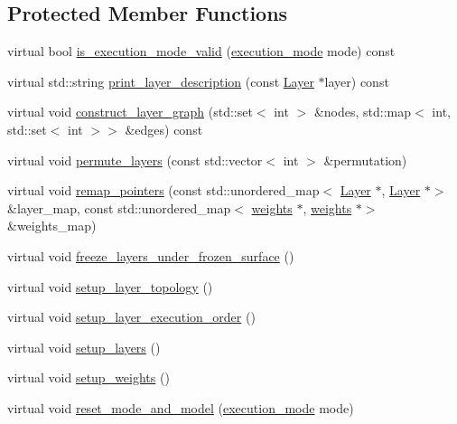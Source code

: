 \subsection*{Protected Member Functions}
\begin{DoxyCompactItemize}
\item 
virtual bool \hyperlink{classlbann_1_1model_a2c82c9def03b1c60e48f52fca7708833}{is\+\_\+execution\+\_\+mode\+\_\+valid} (\hyperlink{base_8hpp_a2781a159088df64ed7d47cc91c4dc0a8}{execution\+\_\+mode} mode) const
\item 
virtual std\+::string \hyperlink{classlbann_1_1model_ab173fd93a80a2980059ff292c308cbf5}{print\+\_\+layer\+\_\+description} (const \hyperlink{classlbann_1_1Layer}{Layer} $\ast$layer) const
\item 
virtual void \hyperlink{classlbann_1_1model_aef7a4775c70f96610bfc5a4605b946a5}{construct\+\_\+layer\+\_\+graph} (std\+::set$<$ int $>$ \&nodes, std\+::map$<$ int, std\+::set$<$ int $>$$>$ \&edges) const
\item 
virtual void \hyperlink{classlbann_1_1model_a31c281b63593a0ec7110664f7309b01a}{permute\+\_\+layers} (const std\+::vector$<$ int $>$ \&permutation)
\item 
virtual void \hyperlink{classlbann_1_1model_ac6cc0f5d850cfb997bbbc70eefa0d68f}{remap\+\_\+pointers} (const std\+::unordered\+\_\+map$<$ \hyperlink{classlbann_1_1Layer}{Layer} $\ast$, \hyperlink{classlbann_1_1Layer}{Layer} $\ast$$>$ \&layer\+\_\+map, const std\+::unordered\+\_\+map$<$ \hyperlink{classlbann_1_1weights}{weights} $\ast$, \hyperlink{classlbann_1_1weights}{weights} $\ast$$>$ \&weights\+\_\+map)
\item 
virtual void \hyperlink{classlbann_1_1model_ad0131e36e763470a7bbf67e83b42cd14}{freeze\+\_\+layers\+\_\+under\+\_\+frozen\+\_\+surface} ()
\item 
virtual void \hyperlink{classlbann_1_1model_a7b3e2a643c658dcaa7478d2568f29784}{setup\+\_\+layer\+\_\+topology} ()
\item 
virtual void \hyperlink{classlbann_1_1model_ab0e8af146d4121c1b8b04b4a3c2a455c}{setup\+\_\+layer\+\_\+execution\+\_\+order} ()
\item 
virtual void \hyperlink{classlbann_1_1model_a989ab581e359f65c9238d627cce5b589}{setup\+\_\+layers} ()
\item 
virtual void \hyperlink{classlbann_1_1model_a582edc0f930e1594381ecc7922e91b08}{setup\+\_\+weights} ()
\item 
virtual void \hyperlink{classlbann_1_1model_a5d188d75f53e0a4c6161500181b27c03}{reset\+\_\+mode\+\_\+and\+\_\+model} (\hyperlink{base_8hpp_a2781a159088df64ed7d47cc91c4dc0a8}{execution\+\_\+mode} mode)
$$
\end{DoxyCompactItemize}
